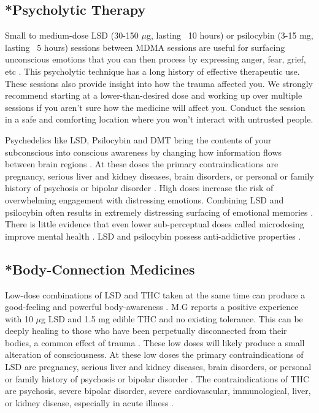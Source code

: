 \documentclass[12pt,letterpaper]{article}
\begin{document}
\subsection{*Psycholytic Therapy}
\label{psychedelics}
Small to medium-dose LSD (30-150 $\mu$g, lasting ~10 hours) or psilocybin (3-15 mg, lasting ~5 hours) sessions between MDMA sessions are useful for surfacing unconscious emotions that you can then process by expressing anger, fear, grief, etc \cite{passiePsycholytic}. This psycholytic technique has a long history of effective therapeutic use. These sessions also provide insight into how the trauma affected you. We strongly recommend starting at a lower-than-desired dose and working up over multiple sessions if you aren't sure how the medicine will affect you. Conduct the session in a safe and comforting location where you won't interact with untrusted people. 

Psychedelics like LSD, Psilocybin and DMT bring the contents of your subconscious into conscious awareness by changing how information flows between brain regions \cite{tagliazucchiConnectivity}. At these doses the primary contraindications are pregnancy, serious liver and kidney diseases, brain disorders, or personal or family history of psychosis or bipolar disorder \cite{schlagPsychedelicAdverseEffects,passiePsycholytic}. High doses increase the risk of overwhelming engagement with distressing emotions. Combining LSD and psilocybin often results in extremely distressing surfacing of emotional memories \cite{colemanPsychedelicPsychotherapy}. There is little evidence that even lower sub-perceptual doses called microdosing improve mental health \cite{politoMicrodosing}. LSD and psilocybin possess anti-addictive properties \cite{principeAddiction}.
\subsection{*Body-Connection Medicines}
Low-dose combinations of LSD and THC taken at the same time can produce a good-feeling and powerful body-awareness \cite{colemanPsychedelicPsychotherapy}. M.G reports a positive experience with 10 $\mu$g LSD and 1.5 mg edible THC and no existing tolerance. This can be deeply healing to those who have been perpetually disconnected from their bodies, a common effect of trauma \cite{vanderKolkBody}. These low doses will likely produce a small alteration of consciousness. At these low doses the primary contraindications of LSD are pregnancy, serious liver and kidney diseases, brain disorders, or personal or family history of psychosis or bipolar disorder \cite{schlagPsychedelicAdverseEffects,passiePsycholytic}. The contraindications of THC are psychosis, severe bipolar disorder, severe cardiovascular, immunological, liver, or kidney disease, especially in acute illness \cite{DCCannabis}.
\end{document}
